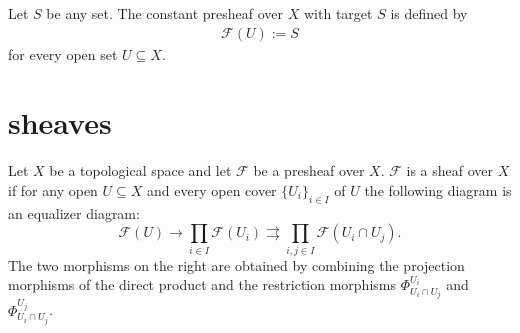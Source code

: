     \begin{example}\label{sheaf:constant_presheaf}
        Let $S$ be any set. The constant presheaf over $X$ with target $S$ is defined by
        \begin{gather}
            \mathcal{F}(U) := S
        \end{gather}
        for every open set $U\subseteq X$.
    \end{example}

\section{sheaves}

    \begin{property}
        Let $X$ be a topological space and let $\mathcal{F}$ be a presheaf over $X$. $\mathcal{F}$ is a sheaf over $X$ if for any open $U\subseteq X$ and every open cover $\{U_i\}_{i\in I}$ of $U$ the following diagram is an equalizer diagram:
        \begin{equation}
            \mathcal{F}(U)\rightarrow\prod_{i\in I}\mathcal{F}(U_i)\rightrightarrows\prod_{i, j\in I}\mathcal{F}(U_i\cap U_j).
        \end{equation}
        The two morphisms on the right are obtained by combining the projection morphisms of the direct product and the restriction morphisms $\Phi^{U_i}_{U_i\cap U_j}$ and $\Phi^{U_j}_{U_i\cap U_j}$.
    \end{property}

